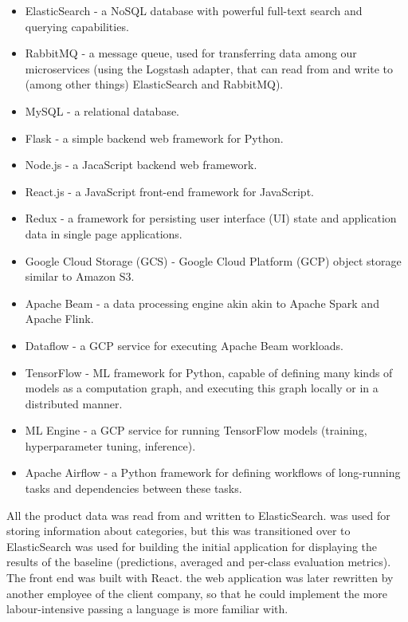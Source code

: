 \begin{itemize}
  \item ElasticSearch - a NoSQL database with powerful full-text search and querying capabilities.
  \item RabbitMQ - a message queue, used for transferring data among our microservices (using the Logstash adapter, that can read from and write to (among other things) ElasticSearch and RabbitMQ).
  \item MySQL - a relational database.
  \item Flask - a simple backend web framework for Python.
  \item Node.js - a JacaScript backend web framework.
  \item React.js - a JavaScript front-end framework for JavaScript.
  \item Redux - a framework for persisting user interface (UI) state and application data in single page applications.
  \item Google Cloud Storage (GCS) - Google Cloud Platform (GCP) object storage similar to Amazon S3.
  \item Apache Beam - a data processing engine akin akin to Apache Spark and Apache Flink.
  \item Dataflow - a GCP service for executing Apache Beam workloads.
  \item TensorFlow - ML framework for Python, capable of defining many kinds of models as a computation graph, and executing this graph locally or in a distributed manner.
  \item ML Engine - a GCP service for running TensorFlow models (training, hyperparameter tuning, inference).
  \item Apache Airflow - a Python framework for defining workflows of long-running tasks and dependencies between these tasks.
\end{itemize}

All the product data was read from and written to ElasticSearch.
was used for storing information about categories, but this was transitioned over to ElasticSearch
was used for building the initial application for displaying the results of the baseline (predictions, averaged and per-class evaluation metrics). The front end was built with React.
the web application was later rewritten by another employee of the client company, so  that he could implement the more labour-intensive  passing a language is more familiar with.

